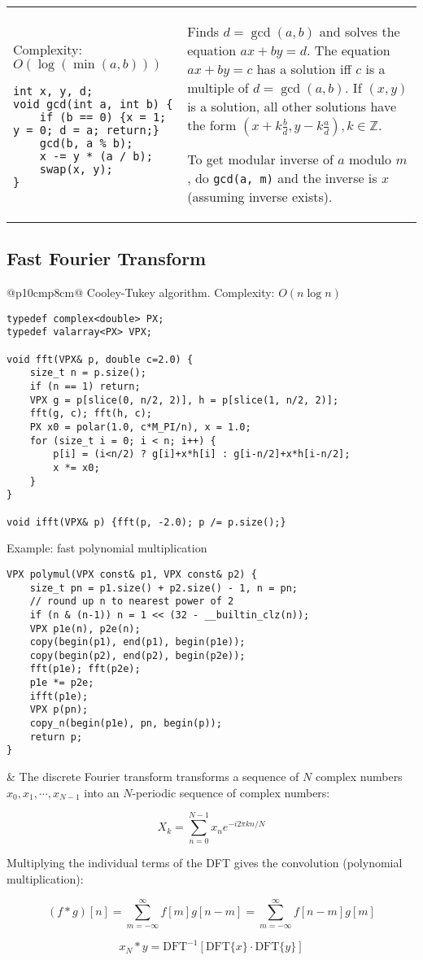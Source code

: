 \documentclass[letterpaper]{article}
\begin{document}
\begin{tabular}{@{}p{9cm}p{9cm}@{}}
Complexity: $O\left(\log\left(\min\left(a,b\right)\right)\right)$

\begin{lstlisting}
int x, y, d;
void gcd(int a, int b) {
	if (b == 0) {x = 1; y = 0; d = a; return;}
	gcd(b, a % b);
	x -= y * (a / b);
	swap(x, y);
}
\end{lstlisting}
&
Finds $d=\gcd(a,b)$ and solves the equation $ax+by=d$. The equation $ax+by=c$ has a solution iff $c$ is a multiple of $d=\gcd(a,b)$. If $(x,y)$ is a solution, all other solutions have the form $(x + k\frac bd, y - k\frac ad), k\in\mathbb Z$.

To get modular inverse of $a$ modulo $m$, do \texttt{gcd(a, m)} and the inverse is $x$ (assuming inverse exists).
\end{tabular}

\subsection{Fast Fourier Transform}
\begin{tabular}{@{}p{10cm}p{8cm}@{}}
Cooley-Tukey algorithm. Complexity: $O\left(n\log n\right)$

\begin{lstlisting}
typedef complex<double> PX;
typedef valarray<PX> VPX;

void fft(VPX& p, double c=2.0) {
	size_t n = p.size();
	if (n == 1) return;
	VPX g = p[slice(0, n/2, 2)], h = p[slice(1, n/2, 2)];
	fft(g, c); fft(h, c);
	PX x0 = polar(1.0, c*M_PI/n), x = 1.0;
	for (size_t i = 0; i < n; i++) {
		p[i] = (i<n/2) ? g[i]+x*h[i] : g[i-n/2]+x*h[i-n/2];
		x *= x0;
	}
}

void ifft(VPX& p) {fft(p, -2.0); p /= p.size();}
\end{lstlisting}

Example: fast polynomial multiplication
\begin{lstlisting}
VPX polymul(VPX const& p1, VPX const& p2) {
	size_t pn = p1.size() + p2.size() - 1, n = pn;
	// round up n to nearest power of 2
	if (n & (n-1)) n = 1 << (32 - __builtin_clz(n));
	VPX p1e(n), p2e(n);
	copy(begin(p1), end(p1), begin(p1e));
	copy(begin(p2), end(p2), begin(p2e));
	fft(p1e); fft(p2e);
	p1e *= p2e;
	ifft(p1e);
	VPX p(pn);
	copy_n(begin(p1e), pn, begin(p));
	return p;
}
\end{lstlisting}
&
The discrete Fourier transform transforms a sequence of $N$ complex numbers $x_0,x_1,\cdots,x_{N-1}$ into an $N$-periodic sequence of complex numbers:

$$
X_k = \sum_{n=0}^{N-1} x_ne^{-i2\pi kn/N}
$$

Multiplying the individual terms of the DFT gives the convolution (polynomial multiplication):

$$
(f*g)[n] = \sum_{m=-\infty}^{\infty} f[m]g[n-m] = \sum_{m=-\infty}^{\infty} f[n-m]g[m]
$$

$$
x_N*y = \text{DFT}^{-1}\left[\text{DFT}\{x\}\cdot\text{DFT}\{y\}\right]
$$

\end{tabular}
\end{document}
